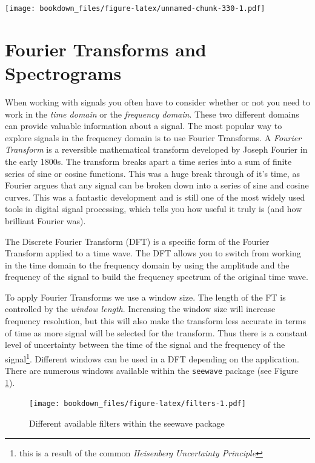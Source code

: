 \documentclass[
]{krantz}
\begin{document}
\texttt{[image: bookdown\_files/figure-latex/unnamed-chunk-330-1.pdf]}

\hypertarget{fourier-transforms-and-spectrograms}{%
\section{Fourier Transforms and Spectrograms}\label{fourier-transforms-and-spectrograms}}

When working with signals you often have to consider whether or not you need to work in the \emph{time domain} or the \emph{frequency domain}. These two different domains can provide valuable information about a signal. The most popular way to explore signals in the frequency domain is to use Fourier Transforms. A \emph{Fourier Transform} is a reversible mathematical transform developed by Joseph Fourier in the early 1800s. The transform breaks apart a time series into a sum of finite series of sine or cosine functions. This was a huge break through of it's time, as Fourier argues that any signal can be broken down into a series of sine and cosine curves. This was a fantastic development and is still one of the most widely used tools in digital signal processing, which tells you how useful it truly is (and how brilliant Fourier was).

The Discrete Fourier Transform (DFT) is a specific form of the Fourier Transform applied to a time wave. The DFT allows you to switch from working in the time domain to the frequency domain by using the amplitude and the frequency of the signal to build the frequency spectrum of the original time wave.

To apply Fourier Transforms we use a window size. The length of the FT is controlled by the \emph{window length}. Increasing the window size will increase frequency resolution, but this will also make the transform less accurate in terms of time as more signal will be selected for the transform. Thus there is a constant level of uncertainty between the time of the signal and the frequency of the signal\footnote{this is a result of the common \emph{Heisenberg Uncertainty Principle}}. Different windows can be used in a DFT depending on the application. There are numerous windows available within the \texttt{seewave} package (see Figure \ref{fig:filters}).

\begin{figure}
\centering
\texttt{[image: bookdown\_files/figure-latex/filters-1.pdf]}
\caption{\label{fig:filters}Different available filters within the seewave package}
\end{figure}
\end{document}

